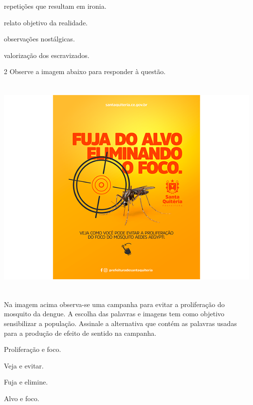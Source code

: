\begin{escolha}

  \item repetições que resultam em ironia.
  
  \item relato objetivo da realidade.
  
  \item observações nostálgicas. 
  
  \item valorização dos escravizados. 

\end{escolha}

\num{2} Observe a imagem abaixo para responder à questão. 

\includegraphics[width=5.90551in,height=4.43056in]{./imgSAEB_7_POR/media/image6.png}


Na imagem acima observa-se uma campanha para evitar a proliferação do
mosquito da dengue. A escolha das palavras e imagens tem como objetivo
sensibilizar a população. Assinale a alternativa que contém as palavras
usadas para a produção de efeito de sentido na campanha. 

\begin{escolha}
  
  \item Proliferação e foco.
  
  \item Veja e evitar.
  
  \item Fuja e elimine.
  
  \item Alvo e foco. 

\end{escolha}

